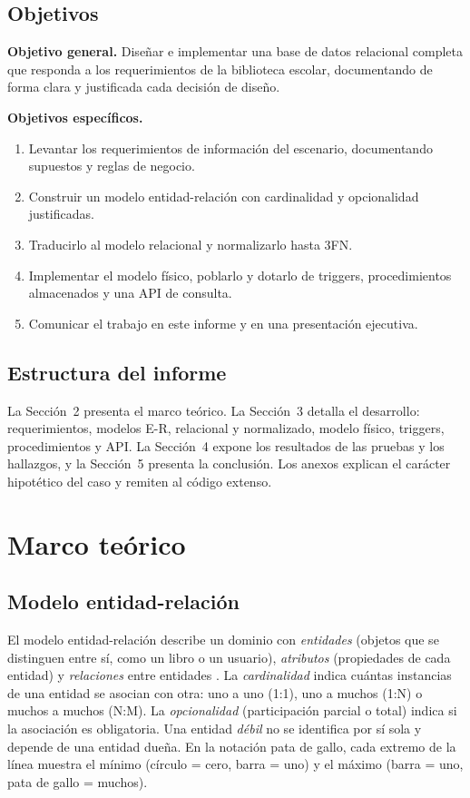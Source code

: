 \documentclass[11pt,a4paper]{article}
\begin{document}
\subsection{Objetivos}
\textbf{Objetivo general.} Diseñar e implementar una base de datos relacional completa que responda a los requerimientos de la biblioteca escolar, documentando de forma clara y justificada cada decisión de diseño.

\textbf{Objetivos específicos.}
\begin{enumerate}[nosep]
\item Levantar los requerimientos de información del escenario, documentando supuestos y reglas de negocio.
\item Construir un modelo entidad-relación con cardinalidad y opcionalidad justificadas.
\item Traducirlo al modelo relacional y normalizarlo hasta 3FN.
\item Implementar el modelo físico, poblarlo y dotarlo de triggers, procedimientos almacenados y una API de consulta.
\item Comunicar el trabajo en este informe y en una presentación ejecutiva.
\end{enumerate}

\subsection{Estructura del informe}
La Sección~2 presenta el marco teórico. La Sección~3 detalla el desarrollo: requerimientos, modelos E-R, relacional y normalizado, modelo físico, triggers, procedimientos y API. La Sección~4 expone los resultados de las pruebas y los hallazgos, y la Sección~5 presenta la conclusión. Los anexos explican el carácter hipotético del caso y remiten al código extenso.

\section{Marco teórico}

\subsection{Modelo entidad-relación}
El modelo entidad-relación describe un dominio con \emph{entidades} (objetos que se distinguen entre sí, como un libro o un usuario), \emph{atributos} (propiedades de cada entidad) y \emph{relaciones} entre entidades \cite{elmasri}. La \emph{cardinalidad} indica cuántas instancias de una entidad se asocian con otra: uno a uno (1:1), uno a muchos (1:N) o muchos a muchos (N:M). La \emph{opcionalidad} (participación parcial o total) indica si la asociación es obligatoria. Una entidad \emph{débil} no se identifica por sí sola y depende de una entidad dueña. En la notación pata de gallo, cada extremo de la línea muestra el mínimo (círculo = cero, barra = uno) y el máximo (barra = uno, pata de gallo = muchos).
\end{document}
